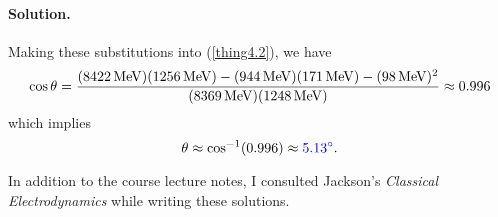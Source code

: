 \documentclass[11pt]{article}
\newcommand{\refeq}[1]{(\ref{#1})}
\newcommand{\beq}{\begin{equation*}}
\newcommand{\eeq}{\end{equation*}}
\newenvironment{solution}
{
	\paragraph{Solution.}
	\ignorespaces
}
{
    \bigskip
}
\begin{document}
\begin{solution}
	Making these substitutions into \refeq{thing4.2}, we have
	\beq
		\cos\tht = \frac{(\Enuc) (\Epi) - (\Enucp) (\Epip) - (\pnucp)^2}{(\pnuc) (\ppi)}
		\approx 0.996
	\eeq
	which implies
	\beq
		\tht \approx \cos[-1](0.996)
		\approx {\color{blue} 5.13^\circ}.
	\eeq
\end{solution}




\clearpage





\vfill
In addition to the course lecture notes, I consulted Jackson's \emph{Classical Electrodynamics} while writing these solutions.
\end{document}

